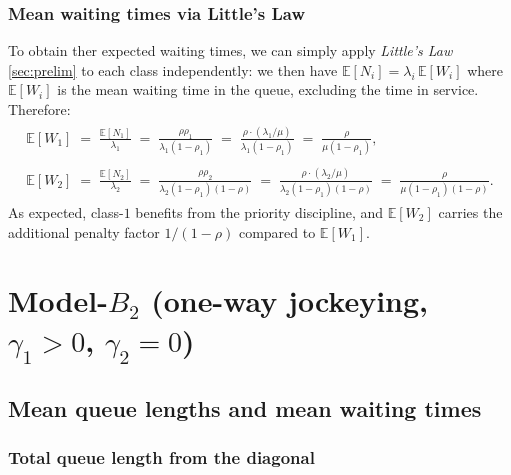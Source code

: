 \documentclass{article}
\numberwithin{equation}{section}
\begin{document}
\subsubsection{Mean waiting times via Little's Law}

To obtain ther expected waiting times, we can simply apply \emph{Little's Law} \ref{sec:prelim} to each class independently: we then have $\mathbb{E}[N_i]=\lambda_i\,\mathbb{E}[W_i]$ where $\mathbb{E}[W_i]$ is the mean waiting time in the queue, excluding the time in service. Therefore:
\begin{align}
    \begin{split}
        \mathbb{E}[W_1]
        \;=\; \frac{\mathbb{E}[N_1]}{\lambda_1}
        \;=\; \frac{\rho\rho_1}{\lambda_1(1-\rho_1)}
        \;=\; \frac{\rho\cdot(\lambda_1/\mu)}{\lambda_1(1-\rho_1)}
        \;=\; \frac{\rho}{\mu(1-\rho_1)},
    \end{split}
    \label{eq:A:EW1} \\[4pt]
    \begin{split}
        \mathbb{E}[W_2]
        \;=\; \frac{\mathbb{E}[N_2]}{\lambda_2}
        \;=\; \frac{\rho\rho_2}{\lambda_2(1-\rho_1)(1-\rho)}
        \;=\; \frac{\rho\cdot(\lambda_2/\mu)}{\lambda_2(1-\rho_1)(1-\rho)}
        \;=\; \frac{\rho}{\mu(1-\rho_1)(1-\rho)}.
    \end{split}
    \label{eq:A:EW2}
\end{align}
As expected, class-$1$ benefits from the priority discipline, and $\mathbb{E}[W_2]$ carries the additional penalty factor $1/(1-\rho)$ compared to $\mathbb{E}[W_1]$.

\section{Model-$B_2$ (one-way jockeying, $\gamma_1>0$, $\gamma_2=0$)}

\subsection{Mean queue lengths and mean waiting times}

\subsubsection*{Total queue length from the diagonal}
\end{document}
